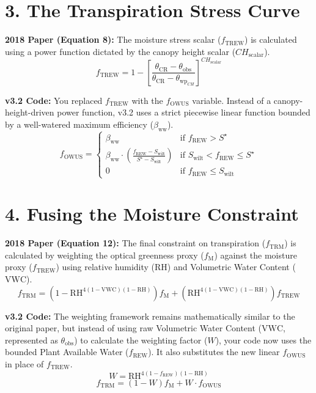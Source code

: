 \documentclass[11pt]{article}
\begin{document}
\section*{3. The Transpiration Stress Curve}

\textbf{2018 Paper (Equation 8):} The moisture stress scalar ($f_{\mathrm{TREW}}$) is calculated using a power function dictated by the canopy height scalar ($CH_{\mathrm{scalar}}$).
\[
  f_{\mathrm{TREW}} = 1 - \left[ \frac{\theta_{\mathrm{CR}} - \theta_{\mathrm{obs}}}{\theta_{\mathrm{CR}} - \theta_{\mathrm{wp}_{CH}}} \right]^{CH_{\mathrm{scalar}}}
\]

\textbf{v3.2 Code:} You replaced $f_{\mathrm{TREW}}$ with the $f_{\mathrm{OWUS}}$ variable. Instead of a canopy-height-driven power function, v3.2 uses a strict piecewise linear function bounded by a well-watered maximum efficiency ($\beta_{\mathrm{ww}}$).
\[
  f_{\mathrm{OWUS}} = \begin{cases}
    \beta_{\mathrm{ww}} & \text{if } f_{\mathrm{REW}} > S^\star \\
    \beta_{\mathrm{ww}} \cdot \left(\frac{f_{\mathrm{REW}} - S_{\mathrm{wilt}}}{S^\star - S_{\mathrm{wilt}}}\right) & \text{if } S_{\mathrm{wilt}} < f_{\mathrm{REW}} \le S^\star \\
    0 & \text{if } f_{\mathrm{REW}} \le S_{\mathrm{wilt}}
  \end{cases}
\]

\section*{4. Fusing the Moisture Constraint}

\textbf{2018 Paper (Equation 12):} The final constraint on transpiration ($f_{\mathrm{TRM}}$) is calculated by weighting the optical greenness proxy ($f_{\mathrm{M}}$) against the moisture proxy ($f_{\mathrm{TREW}}$) using relative humidity ($\mathrm{RH}$) and Volumetric Water Content ($\mathrm{VWC}$).
\[
  f_{\mathrm{TRM}} = \left(1 - \mathrm{RH}^{4(1-\mathrm{VWC})(1-\mathrm{RH})}\right)f_{\mathrm{M}} + \left(\mathrm{RH}^{4(1-\mathrm{VWC})(1-\mathrm{RH})}\right)f_{\mathrm{TREW}}
\]

\textbf{v3.2 Code:} The weighting framework remains mathematically similar to the original paper, but instead of using raw Volumetric Water Content ($\mathrm{VWC}$, represented as $\theta_{\mathrm{obs}}$) to calculate the weighting factor ($W$), your code now uses the bounded Plant Available Water ($f_{\mathrm{REW}}$). It also substitutes the new linear $f_{\mathrm{OWUS}}$ in place of $f_{\mathrm{TREW}}$.
\[
  W = \mathrm{RH}^{4(1-f_{\mathrm{REW}})(1-\mathrm{RH})}
\]
\[
  f_{\mathrm{TRM}} = (1 - W)f_{\mathrm{M}} + W \cdot f_{\mathrm{OWUS}}
\]
\end{document}
